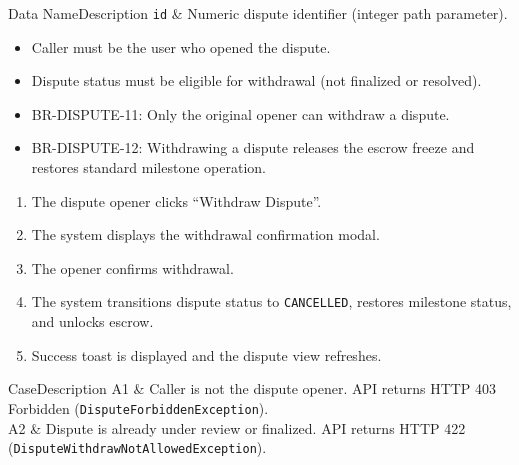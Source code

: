 
\begin{specdatatable}{Data Name}{Description}
      \texttt{id} & Numeric dispute identifier (integer path parameter).\\ \hline
\end{specdatatable}

\begin{itemize}[leftmargin=1.6em,topsep=3pt,itemsep=2pt,parsep=0pt,label=$\bullet$]
      \item Caller must be the user who opened the dispute.
      \item Dispute status must be eligible for withdrawal (not finalized or resolved).
\end{itemize}

\begin{itemize}[leftmargin=1.6em,topsep=3pt,itemsep=2pt,parsep=0pt,label=$\bullet$]\brrulelist
      \item BR-DISPUTE-11: Only the original opener can withdraw a dispute.
      \item BR-DISPUTE-12: Withdrawing a dispute releases the escrow freeze and restores standard milestone operation.
\end{itemize}

\begin{enumerate}[leftmargin=1.8em,topsep=3pt,itemsep=2pt,parsep=0pt]
      \item The dispute opener clicks ``Withdraw Dispute''.
      \item The system displays the withdrawal confirmation modal.
      \item The opener confirms withdrawal.
      \item The system transitions dispute status to \texttt{CANCELLED}, restores milestone status, and unlocks escrow.
      \item Success toast is displayed and the dispute view refreshes.
\end{enumerate}

\begin{flowtable}{Case}{Description}
      A1 & Caller is not the dispute opener. API returns HTTP 403 Forbidden (\texttt{DisputeForbiddenException}).\\ \hline
      A2 & Dispute is already under review or finalized. API returns HTTP 422 (\texttt{DisputeWithdrawNotAllowedException}).\\ \hline
\end{flowtable}

